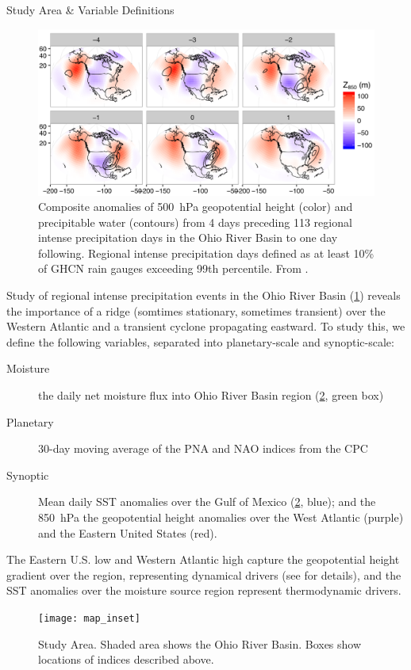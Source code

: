 \begin{block}{Study Area \& Variable Definitions}
    \begin{figure}
        \centering
        \includegraphics[width=0.95\columnwidth]{../FigExternal/djf_composites}
        \caption{Composite anomalies of \SI{500}{\hecto\pascal} geopotential height (color) and precipitable water (contours) from 4 days preceding 113 regional intense precipitation days in the Ohio River Basin to one day following. Regional intense precipitation days defined as at least 10\% of GHCN rain gauges exceeding 99th percentile. From \cite{Farnham2016}.}
        \label{fig:djf-composites}
    \end{figure}
    Study of regional intense precipitation events in the Ohio River Basin (\cref{fig:djf-composites}) reveals the importance of a ridge (somtimes stationary, sometimes transient) over the Western Atlantic and a transient cyclone propagating eastward.
    To study this, we define the following variables, separated into planetary-scale and synoptic-scale:
    \begin{description}
        \item[Moisture] the daily net moisture flux into Ohio River Basin region (\cref{fig:study-area}, green box)
        \item[Planetary] 30-day moving average of the PNA and NAO indices from the CPC
        \item[Synoptic] Mean daily SST anomalies over the Gulf of Mexico (\cref{fig:study-area}, blue); and the \SI{850}{\hecto\pascal} the geopotential height anomalies over the West Atlantic (purple) and the Eastern United States (red).
    \end{description}
    The Eastern U.S. low and Western Atlantic high capture the geopotential height gradient over the region, representing dynamical drivers (see \cite{Farnham2016} for details), and the SST anomalies over the moisture source region \cite[see][and references therein]{Steinschneider2016a} represent thermodynamic drivers.
    \begin{figure}
        \centering
        \texttt{[image: map\_inset]}
        \caption{Study Area. Shaded area shows the Ohio River Basin. Boxes show locations of indices described above.}
        \label{fig:study-area}
    \end{figure}
\end{block}

